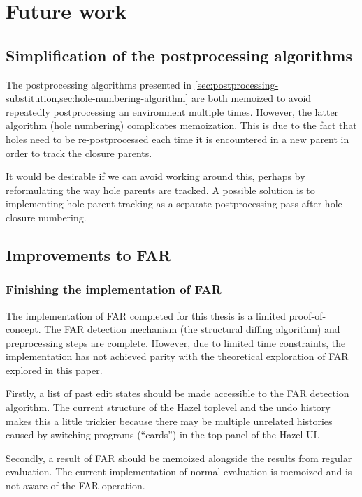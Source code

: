 \chapter{Future work}
\label{sec:future_work}

\section{Simplification of the postprocessing algorithms}
\label{sec:postprocessing-simplification}

The postprocessing algorithms presented in \cref{sec:postprocessing-substitution,sec:hole-numbering-algorithm} are both memoized to avoid repeatedly postprocessing an environment multiple times. However, the latter algorithm (hole numbering) complicates memoization. This is due to the fact that holes need to be re-postprocessed each time it is encountered in a new parent in order to track the closure parents.

It would be desirable if we can avoid working around this, perhaps by reformulating the way hole parents are tracked. A possible solution is to implementing hole parent tracking as a separate postprocessing pass after hole closure numbering.

\section{Improvements to FAR}
\label{sec:far-improvements}

\subsection{Finishing the implementation of FAR}
\label{sec:finishing-far}

The implementation of FAR completed for this thesis is a limited proof-of-concept. The FAR detection mechanism (the structural diffing algorithm) and preprocessing steps are complete. However, due to limited time constraints, the implementation has not achieved parity with the theoretical exploration of FAR explored in this paper.

Firstly, a list of past edit states should be made accessible to the FAR detection algorithm. The current structure of the Hazel toplevel and the undo history makes this a little trickier because there may be multiple unrelated histories caused by switching programs (``cards'') in the top panel of the Hazel UI.

Secondly, a result of FAR should be memoized alongside the results from regular evaluation. The current implementation of normal evaluation is memoized and is not aware of the FAR operation.

